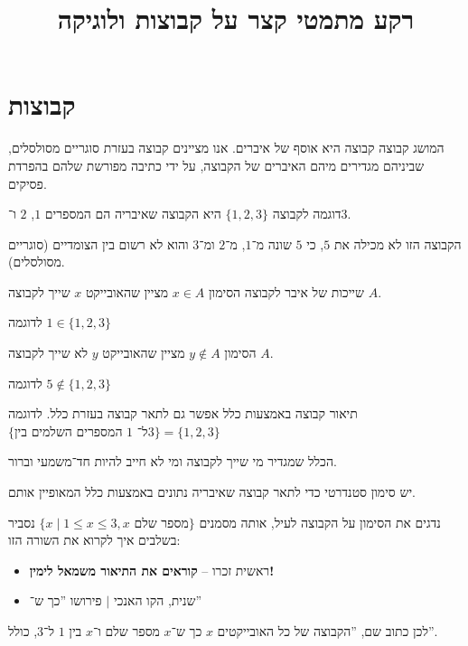\documentclass[aspectratio=169]{beamer}
\title{רקע מתמטי קצר על קבוצות ולוגיקה}
\author{}
\institute{80177 --- חשבון אינפיניטסימלי לתלמידי הנדסה ומדעים}
\date{}
\begin{document}
\frame{\titlepage}

\section{קבוצות}
\begin{frame}{המושג קבוצה}
	קבוצה היא אוסף של איברים. אנו מציינים קבוצה בעזרת סוגריים מסולסלים, שביניהם מגדירים מיהם האיברים של הקבוצה, על ידי כתיבה מפורשת שלהם בהפרדת פסיקים.

\end{frame}
\begin{frame}{דוגמה לקבוצה}
	$\{1,2,3\}$ היא הקבוצה שאיבריה הם המספרים $1$, $2$ ו־$3$.

	הקבוצה הזו לא מכילה את $5$, כי $5$ שונה מ־$1$, מ־$2$ ומ־$3$ והוא לא רשום בין הצומדיים (סוגריים מסולסלים).
\end{frame}


\begin{frame}{שייכות של איבר לקבוצה}
	הסימון $x\in A$ מציין שהאובייקט $x$ שייך לקבוצה $A$.

	לדוגמה $1 \in \{1,2,3\}$

	הסימון $y\notin A$ מציין שהאובייקט $y$ לא שייך לקבוצה $A$.

	לדוגמה $5\notin\{1,2,3\}$
\end{frame}

\begin{frame}{תיאור קבוצה באמצעות כלל}
	אפשר גם לתאר קבוצה בעזרת כלל. לדוגמה $\{ \text{המספרים השלמים בין $1$ ל־$3$} \} = \{1,2,3\}$

	הכלל שמגדיר מי שייך לקבוצה ומי לא חייב להיות חד־משמעי וברור. 

	יש סימון סטנדרטי כדי לתאר קבוצה שאיבריה נתונים באמצעות כלל המאופיין אותם.

	נדגים את הסימון על הקבוצה לעיל, אותה מסמנים $\{ x \mid 1 \le x \le 3, \text{$x$ מספר שלם} \}$
	נסביר בשלבים איך לקרוא את השורה הזו:
	\begin{itemize}
		\item ראשית זכרו – \textbf{קוראים את התיאור משמאל לימין!}
		\item שנית, הקו האנכי $\mid$ פירושו ''כך ש־''
	\end{itemize}
	לכן כתוב שם, ''הקבוצה של כל האובייקטים $x$ כך ש־$x$ מספר שלם ו־$x$ בין $1$ ל־$3$, כולל''.
\end{frame}
\end{document}
